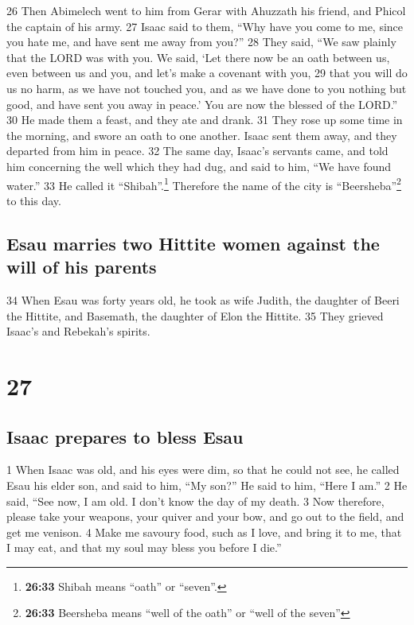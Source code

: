 {26} Then Abimelech went to him from Gerar with Ahuzzath his friend, and
Phicol the captain of his army. {27} Isaac said to them, ``Why have you
come to me, since you hate me, and have sent me away from you?'' {28}
They said, ``We saw plainly that the LORD was with you. We said, `Let
there now be an oath between us, even between us and you, and let's make
a covenant with you, {29} that you will do us no harm, as we have not
touched you, and as we have done to you nothing but good, and have sent
you away in peace.' You are now the blessed of the LORD.'' {30} He made
them a feast, and they ate and drank. {31} They rose up some time in the
morning, and swore an oath to one another. Isaac sent them away, and
they departed from him in peace. {32} The same day, Isaac's servants
came, and told him concerning the well which they had dug, and said to
him, ``We have found water.'' {33} He called it ``Shibah''.\footnote{\textbf{26:33}
  Shibah means ``oath'' or ``seven''.} Therefore the name of the city is
``Beersheba''\footnote{\textbf{26:33} Beersheba means ``well of the
  oath'' or ``well of the seven''} to this day.

\hypertarget{esau-marries-two-hittite-women-against-the-will-of-his-parents}{%
\subsection{Esau marries two Hittite women against the will of his
parents}\label{esau-marries-two-hittite-women-against-the-will-of-his-parents}}

{34} When Esau was forty years old, he took as wife Judith, the daughter
of Beeri the Hittite, and Basemath, the daughter of Elon the Hittite.
{35} They grieved Isaac's and Rebekah's spirits.

\hypertarget{section-26}{%
\section{27}\label{section-26}}

\hypertarget{isaac-prepares-to-bless-esau}{%
\subsection{Isaac prepares to bless
Esau}\label{isaac-prepares-to-bless-esau}}

{1} When Isaac was old, and his eyes were dim, so that he could not see,
he called Esau his elder son, and said to him, ``My son?'' He said to
him, ``Here I am.'' {2} He said, ``See now, I am old. I don't know the
day of my death. {3} Now therefore, please take your weapons, your
quiver and your bow, and go out to the field, and get me venison. {4}
Make me savoury food, such as I love, and bring it to me, that I may
eat, and that my soul may bless you before I die.''

